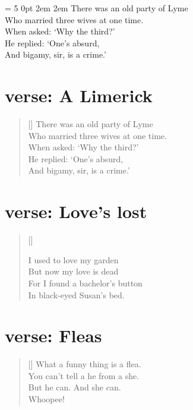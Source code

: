 \documentclass[a5paper]{report}
\newcommand{\garden}{
I used to love my garden \\
But now my love is dead \\
For I found a bachelor’s button \\
In black-eyed Susan’s bed.
}
\newcommand{\attrib}[1]{%
    \nopagebreak{\raggedleft\footnotesize #1\par}}
\begin{document}
\parshape = 5 0pt \linewidth 0pt \linewidth 2em \linewidth 2em \linewidth 0pt \linewidth
\noindent There was an old party of Lyme \\
Who married three wives at one time. \\
When asked: ‘Why the third?’ \\
He replied: ‘One’s absurd, \\
And bigamy, sir, is a crime.’ \par
\newpage


\section{verse: A Limerick}
\settowidth{\versewidth}{There was an old party of Lyme}
\begin{verse}[\versewidth]
There was an old party of Lyme \\
Who married three wives at one time. \\
\vin When asked: ‘Why the third?’ \\
\vin He replied: ‘One’s absurd, \\
And bigamy, sir, is a crime.’ \\
\end{verse}
\newpage


\section{verse: Love’s lost}
\settowidth{\versewidth}{But now my love is dead}
\begin{verse}[\versewidth]
\begin{altverse}
\garden
\end{altverse}
\end{verse}
\newpage


\section{verse: Fleas}
\settowidth{\versewidth}{What a funny thing is a flea}
\begin{verse}[\versewidth]
What a funny thing is a flea. \\
You can’t tell a he from a she. \\
But he can. And she can. \\
Whoopee! \\
\end{verse}
\attrib{Anonymous}
\newpage
\end{document}
